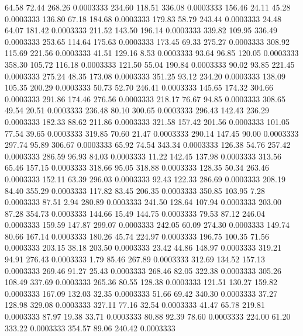   64.58   72.44  268.26   0.0003333
 234.60  118.51  336.08   0.0003333
 156.46   24.11   45.28   0.0003333
 136.80   67.18  184.68   0.0003333
 179.83   58.79  243.44   0.0003333
  24.48   64.07  181.42   0.0003333
 211.52  143.50  196.14   0.0003333
 339.82  109.95  336.49   0.0003333
 253.65  114.64  175.63   0.0003333
 173.45   69.33  275.27   0.0003333
 308.92  115.69  221.56   0.0003333
  41.51  129.16    8.53   0.0003333
  93.64   96.85  120.05   0.0003333
 358.30  105.72  116.18   0.0003333
 121.50   55.04  190.84   0.0003333
  90.02   93.85  221.45   0.0003333
 275.24   48.35  173.08   0.0003333
 351.25   93.12  234.20   0.0003333
 138.09  105.35  200.29   0.0003333
  50.73   52.70  246.41   0.0003333
 145.65  174.32  304.66   0.0003333
 291.86  174.46  276.56   0.0003333
 218.17   76.67   94.85   0.0003333
 308.65   49.54   20.51   0.0003333
 236.48   80.10  300.65   0.0003333
 296.43  142.43  236.29   0.0003333
 182.33   88.62  211.86   0.0003333
 321.58  157.42  201.56   0.0003333
 101.05   77.54   39.65   0.0003333
 319.85   70.60   21.47   0.0003333
 290.14  147.45   90.00   0.0003333
 297.74   95.89  306.67   0.0003333
  65.92   74.54  343.34   0.0003333
 126.38   54.76  257.42   0.0003333
 286.59   96.93   84.03   0.0003333
  11.22  142.45  137.98   0.0003333
 313.56   65.46  157.15   0.0003333
 318.66   95.05  318.88   0.0003333
 128.35   50.34  263.46   0.0003333
 152.11   63.39  296.03   0.0003333
  92.43  122.33  286.69   0.0003333
 208.19   84.40  355.29   0.0003333
 117.82   83.45  206.35   0.0003333
 350.85  103.95    7.28   0.0003333
  87.51    2.94  280.89   0.0003333
 241.50  128.64  107.94   0.0003333
 203.00   87.28  354.73   0.0003333
 144.66   15.49  144.75   0.0003333
  79.53   87.12  246.04   0.0003333
 159.59  147.87  299.07   0.0003333
 242.05   60.09  274.30   0.0003333
 149.74   80.66  167.14   0.0003333
 180.26   45.74  224.97   0.0003333
 196.75  100.35   71.56   0.0003333
 203.15   38.18  203.50   0.0003333
  23.42   44.86  148.97   0.0003333
 319.21   94.91  276.43   0.0003333
   1.79   85.46  267.89   0.0003333
 312.69  134.52  157.13   0.0003333
 269.46   91.27   25.43   0.0003333
 268.46   82.05  322.38   0.0003333
 305.26  108.49  337.69   0.0003333
 265.36   80.55  128.38   0.0003333
 121.51  130.27  159.82   0.0003333
 167.09  132.03   32.35   0.0003333
  51.66   69.42  340.30   0.0003333
  37.27  128.98  329.08   0.0003333
 327.11   77.16   32.54   0.0003333
  41.47   65.78  219.81   0.0003333
  87.97   19.38   33.71   0.0003333
  80.88   92.39   78.60   0.0003333
 224.00   61.20  333.22   0.0003333
 354.57   89.06  240.42   0.0003333
